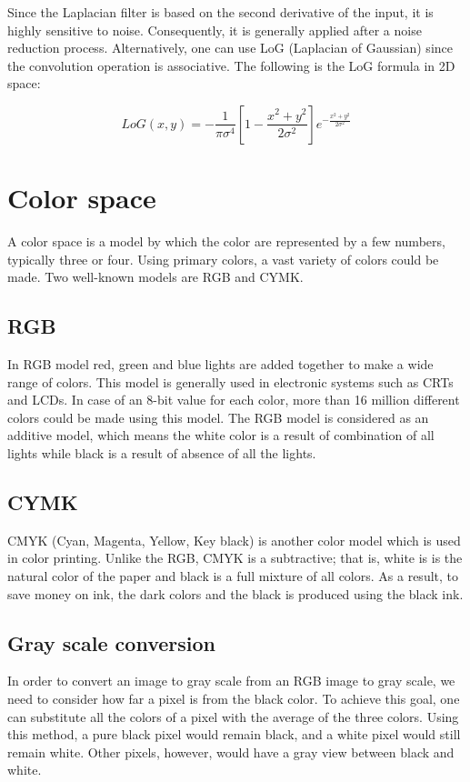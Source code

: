 \documentclass{article}
\begin{document}
			 Since the Laplacian filter is based on the second derivative of the input, it is highly sensitive to noise. Consequently,
			it is generally applied after a noise reduction process. Alternatively, one can use LoG (Laplacian of Gaussian) since the convolution operation is
			associative. The following is the LoG formula in 2D space:

\begin{equation}
			LoG(x,y) = -\frac{1}{\pi\sigma^{4}}[1-\frac{x^{2}+y^{2}}{2\sigma^{2}}]e^{-\frac{x^{2}+y^{2}}{2\sigma^{2}}}
\end{equation}


\section{Color space}    
	A color space is a model by which the color are represented by a few numbers, typically three or four. Using primary colors, a vast variety of colors could be made. Two well-known models are RGB and CYMK.      

	\subsection{RGB}
		In RGB model red, green and blue lights are added together to make a wide range of colors. This model is generally used in electronic systems such as CRTs and LCDs. In case of an 8-bit value for each color, more than 16 million different colors
		could be made using this model. The RGB model is considered as an additive model, which means the white color is a result of combination of all lights while black is a result of absence of all the lights.
	

	\subsection{CYMK}

		CMYK (Cyan, Magenta, Yellow, Key black) is another color model which is used in color printing. Unlike the RGB, CMYK is a subtractive; that is, white is is the natural color of the paper and black is a full mixture of all colors.
		As a result, to save money on ink, the dark colors and the black is produced using the black ink.

	\subsection{Gray scale conversion}

		In order to convert an image to gray scale from an RGB image to gray scale, we need to consider how far a pixel is from the black color. To achieve this goal, one can substitute all the colors of a pixel with the average of the three colors. Using this method, a pure black pixel would remain black, and a white pixel would still remain white. Other pixels, however, would have a gray view between black and white.
\end{document}
